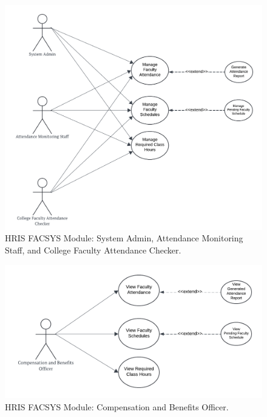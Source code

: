     \begin{figure}[H]
        \centering
        \includegraphics[width=0.9\linewidth]{figures/images/use-case-fac-1.png}
        \caption{HRIS FACSYS Module: System Admin, Attendance Monitoring Staff, and College Faculty Attendance Checker.}
        \label{fig:use-case-fac-1}
    \end{figure}

    \begin{figure}[H]
        \centering
        \includegraphics[width=0.9\linewidth]{figures/images/use-case-fac-2.png}
        \caption{HRIS FACSYS Module: Compensation and Benefits Officer.}
        \label{fig:use-case-fac-2}
    \end{figure}

